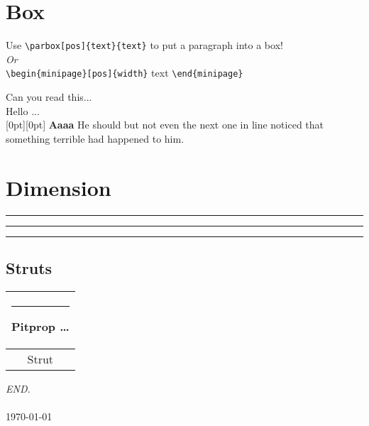 \documentclass[a4paper,12pt,titlepage]{article}
\begin{document}
\section{Box}
Use \verb|\parbox[pos]{text}{text}| to put a paragraph into a box!\\
\emph{\large Or} \\
\verb|\begin{minipage}[pos]{width}| text \verb|\end{minipage}|  \\

\par
{}\par
{}\par
{}\par
{}
Can you read this...\\

Hello ...\\
\raisebox{0pt}[0pt][0pt]{\Large %
\textbf{Aaaa\raisebox{-0.3ex}{a} %
\raisebox{-0.7ex}{aa}
\raisebox{-1.2ex}{r}
\raisebox{-2.2ex}{g}
\raisebox{-4.5ex}{h}}
}
He should but not even the next one in line noticed that something terrible had happened to him.

\section{Dimension}
\rule{3mm}{.1pt} %
\rule[-1mm]{5mm}{1cm}
\rule[1mm]{1cm}{3mm}

\subsection{Struts}
\begin{tabular}{|c|}
\hline
\rule{1pt}{4ex}Pitprop \ldots\\
\hline
\rule{0pt}{4ex} Strut\\
\hline
\end{tabular}

\begin{flushright}
{
\Huge
\textit{END.} \\
~\\  %
\today
}
\end{flushright}
\end{document}
